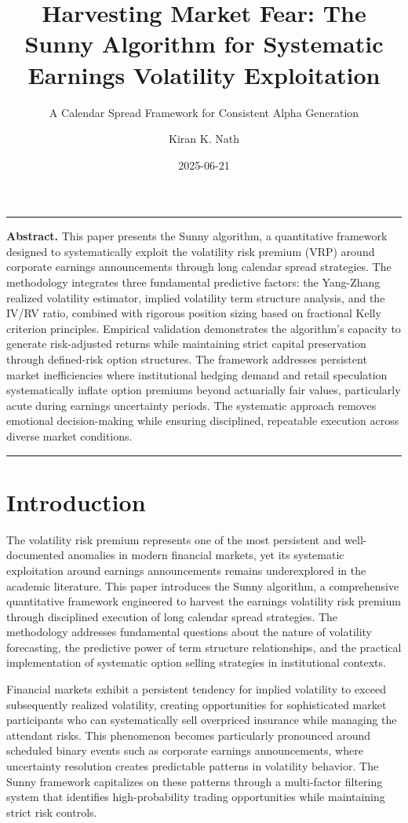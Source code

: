 \documentclass[
  american,
  11pt,
  11pt,
  letterpaper,
  onecolumn]{article}
\title{Harvesting Market Fear: The Sunny Algorithm for Systematic
Earnings Volatility Exploitation}
\subtitle{A Calendar Spread Framework for Consistent Alpha Generation}
\author{Kiran K. Nath}
\date{2025-06-21}
\renewenvironment{abstract}
  {\small\quotation\noindent\rule{\linewidth}{.5pt}\par\smallskip
   \noindent\textbf{Abstract.}\space}
  {\par\smallskip\noindent\rule{\linewidth}{.5pt}\endquotation}
\begin{document}
\maketitle
\begin{abstract}
This paper presents the Sunny algorithm, a quantitative framework
designed to systematically exploit the volatility risk premium (VRP)
around corporate earnings announcements through long calendar spread
strategies. The methodology integrates three fundamental predictive
factors: the Yang-Zhang realized volatility estimator, implied
volatility term structure analysis, and the IV/RV ratio, combined with
rigorous position sizing based on fractional Kelly criterion principles.
Empirical validation demonstrates the algorithm's capacity to generate
risk-adjusted returns while maintaining strict capital preservation
through defined-risk option structures. The framework addresses
persistent market inefficiencies where institutional hedging demand and
retail speculation systematically inflate option premiums beyond
actuarially fair values, particularly acute during earnings uncertainty
periods. The systematic approach removes emotional decision-making while
ensuring disciplined, repeatable execution across diverse market
conditions.
\end{abstract}


\section{Introduction}\label{introduction}

The volatility risk premium represents one of the most persistent and
well-documented anomalies in modern financial markets, yet its
systematic exploitation around earnings announcements remains
underexplored in the academic literature. This paper introduces the
Sunny algorithm, a comprehensive quantitative framework engineered to
harvest the earnings volatility risk premium through disciplined
execution of long calendar spread strategies. The methodology addresses
fundamental questions about the nature of volatility forecasting, the
predictive power of term structure relationships, and the practical
implementation of systematic option selling strategies in institutional
contexts.

Financial markets exhibit a persistent tendency for implied volatility
to exceed subsequently realized volatility, creating opportunities for
sophisticated market participants who can systematically sell overpriced
insurance while managing the attendant risks. This phenomenon becomes
particularly pronounced around scheduled binary events such as corporate
earnings announcements, where uncertainty resolution creates predictable
patterns in volatility behavior. The Sunny framework capitalizes on
these patterns through a multi-factor filtering system that identifies
high-probability trading opportunities while maintaining strict risk
controls.
\end{document}
